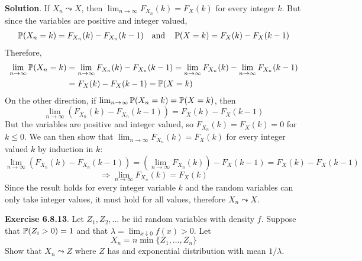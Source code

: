 \textbf{Solution}.
If \(X_{n} \leadsto X\), then
\(\lim _{n \rightarrow \infty} F_{X_{n}}(k) = F_X(k)\) for every integer
\(k\). But since the variables are positive and integer valued,
\begin{align*}\operatorname{\mathbb{P}}(X_{n} = k) = F_{X_{n}}(k) - F_{X_{n}}(k - 1)
\quad\mathrm{and}\quad 
\operatorname{\mathbb{P}}(X = k) = F_X(k) - F_X(k - 1)
\end{align*}
Therefore,
\begin{align*}
\lim _{n \rightarrow \infty} \operatorname{\mathbb{P}}(X_{n} = k) 
& = \lim _{n \rightarrow \infty} F_{X_{n}}(k) - F_{X_{n}}(k - 1)
  = \lim _{n \rightarrow \infty} F_{X_{n}}(k) - \lim _{n \rightarrow \infty} F_{X_{n}}(k - 1)
\\
& = F_X(k) - F_X(k - 1)
  = \operatorname{\mathbb{P}}(X = k)
\end{align*}
On the other direction, if $ \lim_{n \rightarrow \infty}
\operatorname{\mathbb{P}}(X_{n} = k) = \operatorname{\mathbb{P}}(X = k) $, then
\[
\lim _{n \rightarrow \infty}\left( F_{X_{n}}(k) - F_{X_{n}}(k - 1) \right) = F_X(k) - F_X(k - 1)
\]
But the variables are positive and integer valued, so
\(F_{X_{n}}(k) = F_X(k) = 0\) for \(k \leq 0\). We can then show that
\(\lim _{n \rightarrow \infty} F_{X_{n}}(k) = F_X(k)\) for every integer
valued \(k\) by induction in \(k\):
\[
\lim _{n \rightarrow \infty} \left( F_{X_{n}}(k) - F_{X_{n}}(k - 1) \right) = \left( \lim _{n \rightarrow \infty} F_{X_{n}}(k) \right) - F_X(k - 1) = F_X(k) - F_X(k - 1)
\]
\[
\Rightarrow \lim _{n \rightarrow \infty} F_{X_{n}}(k) = F_X(k)
\]
Since the result holds for every integer variable \(k\) and the random
variables can only take integer values, it must hold for all values,
therefore \(X_{n} \leadsto X\).

\textbf{Exercise 6.8.13}. Let \(Z_{1}, Z_{2}, \dots\) be iid random
variables with density \(f\). Suppose that \(\operatorname{\mathbb{P}}(Z_{i} > 0) = 1\)
and that \(\lambda = \lim _{x \downarrow 0} f(x) > 0\). Let
\[
X_{n} = n \min \{ Z_{1}, \dots, Z_{n} \}
\]
Show that \(X_{n} \leadsto Z\) where \(Z\) has and exponential
distribution with mean \(1 / \lambda\).

